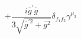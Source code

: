 %
\begin{dmath*}
%
  +  \frac{i {\bar g}^\prime {\bar g}{}}{3 \sqrt{{\bar g}^{\prime 2} + {\bar g}{}^2}}\delta_{f_1 f_2}  \gamma^{\mu_3}
%
\end{dmath*}
%
